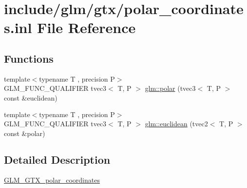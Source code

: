 \hypertarget{polar__coordinates_8inl}{}\section{include/glm/gtx/polar\+\_\+coordinates.inl File Reference}
\label{polar__coordinates_8inl}
\subsection*{Functions}
\begin{DoxyCompactItemize}
\item 
{\footnotesize template$<$typename T , precision P$>$ }\\G\+L\+M\+\_\+\+F\+U\+N\+C\+\_\+\+Q\+U\+A\+L\+I\+F\+I\+ER tvec3$<$ T, P $>$ \hyperlink{group__gtx__polar__coordinates_gafcf95a38c780a4ad5ba14c8ac9e522bb}{glm\+::polar} (tvec3$<$ T, P $>$ const \&euclidean)
\item 
{\footnotesize template$<$typename T , precision P$>$ }\\G\+L\+M\+\_\+\+F\+U\+N\+C\+\_\+\+Q\+U\+A\+L\+I\+F\+I\+ER tvec3$<$ T, P $>$ \hyperlink{group__gtx__polar__coordinates_ga45ece1fbf7260c43e0f873c498202581}{glm\+::euclidean} (tvec2$<$ T, P $>$ const \&polar)
\end{DoxyCompactItemize}


\subsection{Detailed Description}
\hyperlink{group__gtx__polar__coordinates}{G\+L\+M\+\_\+\+G\+T\+X\+\_\+polar\+\_\+coordinates} 